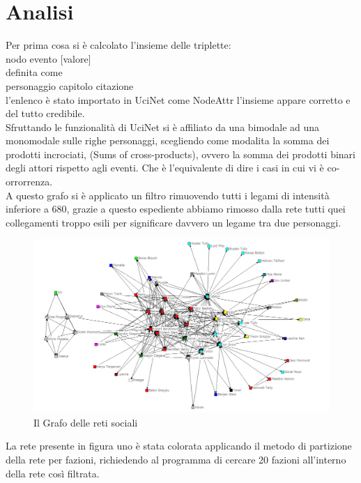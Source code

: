 \documentclass[a4paper]{article}
\begin{document}
\section{Analisi}
Per prima cosa si è calcolato l'insieme delle triplette:\\
nodo evento [valore]\\
definita come\\
personaggio capitolo citazione\\
l'enlenco è stato importato in UciNet come NodeAttr l'insieme appare corretto e del tutto credibile.\\
Sfruttando le funzionalità di UciNet si è affiliato da una bimodale ad una monomodale sulle righe personaggi, scegliendo come modalita la somma dei prodotti incrociati, (Sums of cross-products), ovvero la somma dei prodotti binari degli attori rispetto agli eventi. Che è l'equivalente di dire i casi in cui vi è co-orrorrenza.\\
A questo grafo si è applicato un filtro rimuovendo tutti i legami di intensità inferiore a 680, grazie a questo espediente abbiamo rimosso dalla rete tutti quei collegamenti troppo esili per significare davvero un legame tra due personaggi. 
\begin{figure}[h]
\centering
\includegraphics[width=.9\textwidth]{picture/029.png}
\caption{Il Grafo delle reti sociali}
\label{fig:grafo-partito}
\end{figure}
La rete presente in figura uno è stata colorata applicando il metodo di partizione della rete per fazioni, richiedendo al programma di cercare 20 fazioni all'interno della rete così filtrata.\\
\end{document}
